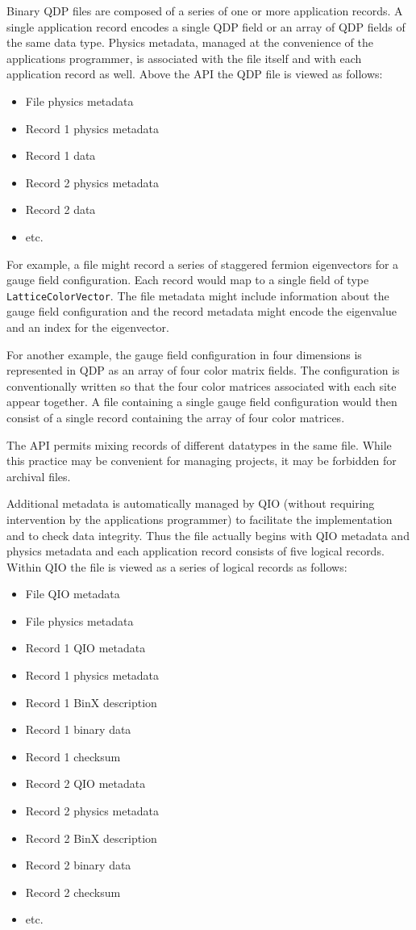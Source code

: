 \documentclass[12pt,letterpaper]{article}
\begin{document}
Binary QDP files are composed of a series of one or more application
records.  A single application record encodes a single QDP field or an
array of QDP fields of the same data type.  Physics metadata, managed
at the convenience of the applications programmer, is associated with
the file itself and with each application record as well. Above the
API the QDP file is viewed as follows:
%
\begin{itemize}
  \item File physics metadata
  \item Record 1 physics metadata
  \item Record 1 data
  \item Record 2 physics metadata
  \item Record 2 data
  \item etc.
\end{itemize}
%
For example, a file might record a series of staggered fermion
eigenvectors for a gauge field configuration.  Each record would map
to a single field of type \verb|LatticeColorVector|.  The file metadata
might include information about the gauge field configuration and the
record metadata might encode the eigenvalue and an index for the
eigenvector.

For another example, the gauge field configuration in four dimensions
is represented in QDP as an array of four color matrix fields.  The
configuration is conventionally written so that the four color matrices
associated with each site appear together.  A file containing a single
gauge field configuration would then consist of a single record
containing the array of four color matrices.

The API permits mixing records of different datatypes in the same
file.  While this practice may be convenient for managing projects, it
may be forbidden for archival files.

Additional metadata is automatically managed by QIO (without requiring
intervention by the applications programmer) to facilitate the
implementation and to check data integrity.  Thus the file actually
begins with QIO metadata and physics metadata and each application
record consists of five logical records.  Within QIO the file is
viewed as a series of logical records as follows:
%
\begin{itemize}
  \item File QIO metadata
  \item File physics metadata
  \item Record 1 QIO metadata
  \item Record 1 physics metadata
  \item Record 1 BinX description
  \item Record 1 binary data
  \item Record 1 checksum
  \item Record 2 QIO metadata
  \item Record 2 physics metadata
  \item Record 2 BinX description
  \item Record 2 binary data
  \item Record 2 checksum
  \item etc.
\end{itemize}
%
\end{document}
